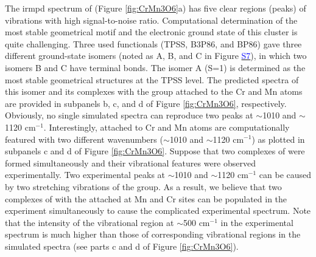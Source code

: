 \begin{refsection}
The \acrshort{irmpd} spectrum of  (Figure \ref{fig:CrMn3O6}a) has five clear regions (peaks) of vibrations with high signal-to-noise ratio. Computational determination of the most stable geometrical motif and the electronic ground state of this cluster is quite challenging. Three used functionals (TPSS, B3P86, and BP86) gave three different ground-state isomers (noted as A, B, and C in Figure \href{https://github.com/phamlenhan/PhDDissertation/blob/master/Chapter-8SI-Nhan-thesis-CrMnO.pdf}{\textcolor{blue}{S7}}\commenttext{\ref{SI:figs:CrMn3O6}}), in which two isomers B and C have terminal  bonds. The isomer A (S=1) is determined as the most stable geometrical structures at the TPSS level. The predicted spectra of this isomer and its complexes with the  group attached to the Cr and Mn atoms are provided in subpanels b, c, and d of Figure \ref{fig:CrMn3O6}, respectively. Obviously, no single simulated spectra can reproduce two peaks at $\sim$1010 and $\sim$1120 cm$^{-1}$. Interestingly,  attached to Cr and Mn atoms are computationally featured with two different wavenumbers ($\sim$1010 and $\sim$1120 cm$^{-1}$) as plotted in subpanels c and d of Figure \ref{fig:CrMn3O6}. Suppose that two complexes of  were formed simultaneously and their vibrational features were observed experimentally. Two experimental peaks at $\sim$1010 and $\sim$1120 cm$^{-1}$ can be caused by two stretching vibrations of the  group. As a result, we believe that two complexes of  with the attached  at Mn and Cr sites can be populated in the experiment simultaneously to cause the complicated experimental spectrum. Note that the intensity of the vibrational region at $\sim$500 cm$^{-1}$ in the experimental spectrum is much higher than those of corresponding vibrational regions in the simulated spectra (see parts c and d of Figure \ref{fig:CrMn3O6}).


\FloatBarrier




\end{refsection}
